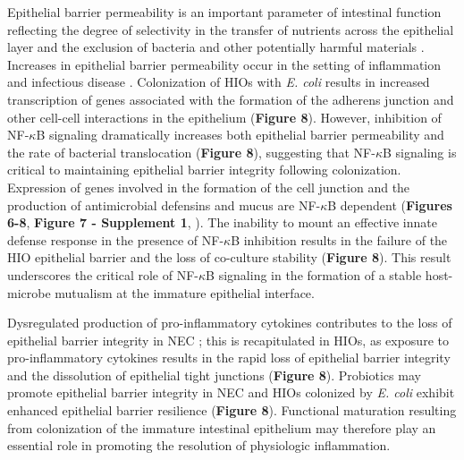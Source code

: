 \documentclass[9pt,lineo]{elife}
\begin{document}
Epithelial barrier permeability is an important parameter of intestinal function reflecting the degree of selectivity in the transfer of nutrients across the epithelial layer and the exclusion of bacteria and other potentially harmful materials \citep{Bischoff:2014}. Increases in epithelial barrier permeability occur in the setting of inflammation \citep{Ahmad:2017,Michielan:2015} and infectious disease \citep{Shawki:2017}. Colonization of HIOs with \emph{E. coli} results in increased transcription of genes associated with the formation of the adherens junction and other cell-cell interactions in the epithelium (\textbf{Figure 8}). However, inhibition of NF-\(\kappa\)B signaling dramatically increases both epithelial barrier permeability and the rate of bacterial translocation (\textbf{Figure 8}), suggesting that NF-\(\kappa\)B signaling is critical to maintaining epithelial barrier integrity following colonization. Expression of genes involved in the formation of the cell junction and the production of antimicrobial defensins and mucus are NF-\(\kappa\)B dependent (\textbf{Figures 6-8}, \textbf{Figure 7 - Supplement 1},  \citealt{Tsutsumi-Ishii:2002,Ahn:2005}). The inability to mount an effective innate defense response in the presence of NF-\(\kappa\)B inhibition results in the failure of the HIO epithelial barrier and the loss of co-culture stability (\textbf{Figure 8}). This result underscores the critical role of NF-\(\kappa\)B signaling in the formation of a stable host-microbe mutualism at the immature epithelial interface.

Dysregulated production of pro-inflammatory cytokines  contributes to the loss of epithelial barrier integrity in NEC \citep{Tanner:2015,Hackam:2013,Neu:2011,Nanthakumar:2011,Halpern:2003,Ford:1997,Ford:1996,Tan:1993}; this is recapitulated in HIOs, as exposure to pro-inflammatory cytokines results in the rapid loss of epithelial barrier integrity and the dissolution of epithelial tight junctions (\textbf{Figure 8}). Probiotics may promote epithelial barrier integrity in NEC \citep{Robinson:2014,Alfaleh:2011,Underwood:2014,Khailova:2009} and HIOs colonized by \emph{E. coli} exhibit enhanced epithelial barrier resilience (\textbf{Figure 8}). Functional maturation resulting from colonization of the immature intestinal epithelium may therefore play an essential role in promoting the resolution of physiologic inflammation.
\end{document}

